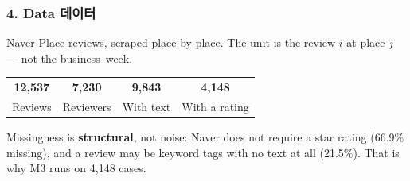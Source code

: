 \documentclass[compress]{beamer}
\newcommand{\ko}[1]{{\footnotesize\color{black!50}#1}}
\newcommand{\aside}[1]{%
  \begin{center}\colorbox{UBIblue!12}{%
    \parbox{\dimexpr\textwidth-14pt\relax}{\vspace{2pt}#1\vspace{2pt}}}\end{center}}
\begin{document}
\begin{frame}
\frametitle{4. Data \ko{데이터}}
{\small Naver Place reviews, scraped place by place. The unit is the review $i$
at place $j$ — not the business--week.}
\vspace{8pt}
\begin{center}
\begin{tabular}{@{}cccc@{}}
  {\color{UBIred}\textbf{12,537}} & {\color{UBIred}\textbf{7,230}} &
  {\color{UBIred}\textbf{9,843}}  & {\color{UBIred}\textbf{4,148}} \\
  {\scriptsize Reviews} & {\scriptsize Reviewers} & {\scriptsize With text} &
  {\scriptsize With a rating} \\
\end{tabular}
\end{center}
\vspace{4pt}
\aside{\scriptsize
  Missingness is \textbf{structural}, not noise: Naver does not require a star
  rating (66.9\% missing), and a review may be keyword tags with no text at all
  (21.5\%). That is why M3 runs on 4,148 cases.}
\end{frame}
\end{document}
